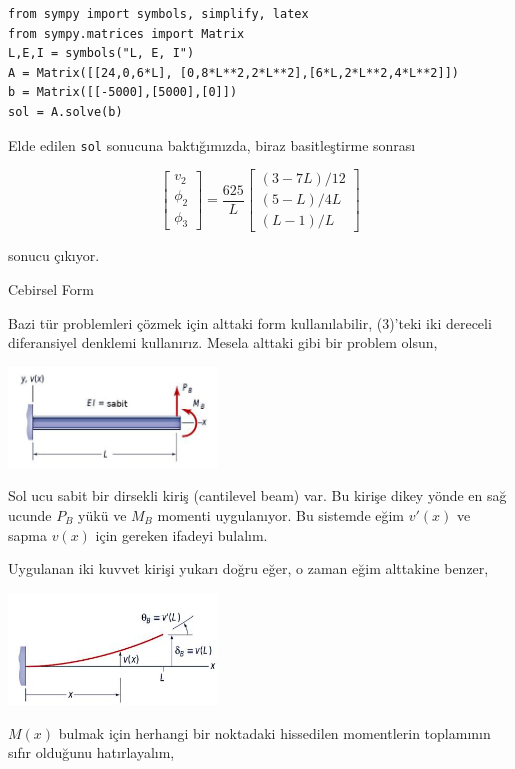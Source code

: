 \documentclass[12pt,fleqn]{article}\usepackage{../../common}
\begin{document}
\begin{verbatim}
from sympy import symbols, simplify, latex
from sympy.matrices import Matrix
L,E,I = symbols("L, E, I")
A = Matrix([[24,0,6*L], [0,8*L**2,2*L**2],[6*L,2*L**2,4*L**2]])
b = Matrix([[-5000],[5000],[0]])
sol = A.solve(b)
\end{verbatim}

Elde edilen \verb!sol! sonucuna baktığımızda, biraz basitleştirme sonrası

$$
\left[\begin{array}{c}
v_2 \\ \phi_2 \\ \phi_3
\end{array}\right] =
\frac{625}{L}
\left[\begin{array}{c}
(3-7L)/12 \\
(5-L)/4L \\
(L-1)/L
\end{array}\right]
$$

sonucu çıkıyor.

Cebirsel Form

Bazi tür problemleri çözmek için alttaki form kullanılabilir, (3)'teki iki
dereceli diferansiyel denklemi kullanırız. Mesela alttaki gibi bir problem
olsun,

\includegraphics[width=15em]{phy_020_strs_05_03.jpg}

Sol ucu sabit bir dirsekli kiriş (cantilevel beam) var. Bu kirişe dikey yönde en
sağ ucunde $P_B$ yükü ve $M_B$ momenti uygulanıyor. Bu sistemde eğim $v'(x)$ ve
sapma $v(x)$ için gereken ifadeyi bulalım.

Uygulanan iki kuvvet kirişi yukarı doğru eğer, o zaman eğim alttakine benzer,

\includegraphics[width=15em]{phy_020_strs_05_04.jpg}

$M(x)$ bulmak için herhangi bir noktadaki hissedilen momentlerin toplamının
sıfır olduğunu hatırlayalım,
\end{document}
